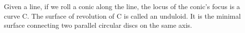  Given a line, if we roll a conic along the line, the locus
of the conic's focus is a curve C. The surface of revolution
of C is called an unduloid.
It is the minimal surface connecting two parallel circular discs
on the same axis.
